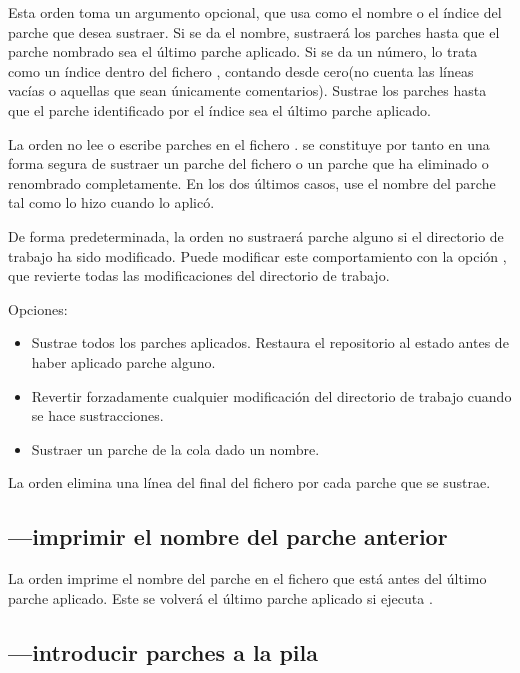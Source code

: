 Esta orden toma un argumento opcional, que usa como el nombre o el
índice del parche que desea sustraer.  Si se da el nombre, sustraerá
los parches hasta que el parche nombrado sea el último parche
aplicado.  Si se da un número,  lo trata como un
índice dentro del fichero ,  contando desde
cero(no cuenta las líneas vacías o aquellas que sean únicamente
comentarios).  Sustrae los parches hasta que el parche identificado
por el índice sea el último parche aplicado.

La orden  no lee o escribe parches en el fichero
.   se constituye por tanto en una
forma segura de sustraer un parche del fichero  o un
parche que ha eliminado o renombrado completamente.  En los dos
últimos casos, use el nombre del parche tal como lo hizo cuando lo
aplicó.

De forma predeterminada, la orden  no sustraerá
parche alguno si el directorio de trabajo ha sido modificado.  Puede
modificar este comportamiento con la opción , que
revierte todas las modificaciones del directorio de trabajo.

Opciones:
\begin{itemize}
\item[\hgxopt{mq}{qpop}{-a}] Sustrae todos los parches aplicados.
  Restaura el repositorio al estado antes de haber aplicado parche alguno.
\item[\hgxopt{mq}{qpop}{-f}] Revertir forzadamente cualquier
  modificación del directorio de trabajo cuando se hace sustracciones.
\item[\hgxopt{mq}{qpop}{-n}] Sustraer un parche de la cola dado un nombre.
\end{itemize}

La orden  elimina una línea del final del fichero
 por cada parche que se sustrae.

\subsection{---imprimir el nombre del parche anterior}

La orden  imprime el nombre del parche en el fichero
 que está antes del último parche aplicado.   Este
se volverá el último parche aplicado si ejecuta .

\subsection{---introducir parches a la pila}
\label{sec:mqref:cmd:qpush}

